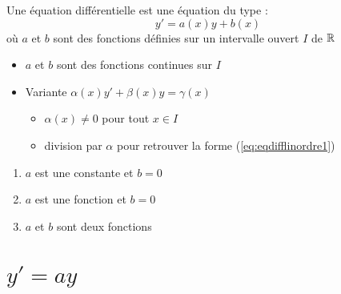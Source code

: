 \begin{frame}
\begin{mydefinition}
Une équation différentielle  est une équation du type : 
\begin{equation}
  y'=a(x)y + b(x)   
  \label{eq:eqdifflinordre1}
  \tag{$E$}
\end{equation}
où $a$ et $b$ sont des fonctions définies sur un intervalle ouvert $I$ de $\mathbb{R}$
\end{mydefinition}

\pause

\begin{itemize}
  \item $a$ et $b$ sont des fonctions continues sur $I$
  \pause
  \item Variante $\alpha (x)y'+\beta (x)y=\gamma (x)$
  \pause
  \begin{itemize}
    \item $\alpha (x)\neq 0$ pour tout $x\in I$
    \pause
    \item division par $\alpha$ pour retrouver la forme (\ref{eq:eqdifflinordre1})
  \end{itemize}
  
\end{itemize}
\pause
\begin{enumerate}
  \item $a$ est une constante et $b=0$
  \pause
  \item $a$ est une fonction et $b=0$
  \pause
  \item $a$ et $b$ sont deux fonctions
\end{enumerate}

\end{frame}




\section*{$y'=ay$}

